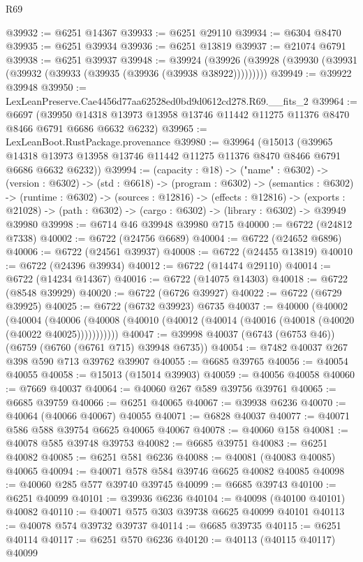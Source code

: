 \begin{lexlean}{R69}
\begin{coremodule}
{@39932 := @6251 @14367
@39933 := @6251 @29110
@39934 := @6304 @8470
@39935 := @6251 @39934
@39936 := @6251 @13819
@39937 := @21074 @6791
@39938 := @6251 @39937
@39948 := @39924
    (@39926 (@39928 (@39930 (@39931 (@39932 (@39933 (@39935 (@39936 (@39938 @38922)))))))))
@39949 := @39922 @39948
@39950 := LexLeanPreserve.Cae4456d77aa62528ed0bd9d0612cd278.R69.__fits_2
@39964 := @6697
    (@39950 @14318 @13973 @13958 @13746 @11442 @11275 @11376 @8470 @8466 @6791 @6686 @6632 @6232)
@39965 := LexLeanBoot.RustPackage.provenance
@39980 := @39964
    (@15013
      (@39965 @14318 @13973 @13958 @13746 @11442 @11275 @11376 @8470 @8466 @6791 @6686 @6632 @6232))
@39994 := (capacity : @18) ->
  ("name" : @6302) ->
  (version : @6302) ->
  (std : @6618) ->
  (program : @6302) ->
  (semantics : @6302) ->
  (runtime : @6302) ->
  (sources : @12816) ->
  (effects : @12816) ->
  (exports : @21028) -> (path : @6302) -> (cargo : @6302) -> (library : @6302) -> @39949 @39980
@39998 := @6714 @46 @39948 @39980 @715
@40000 := @6722 (@24812 @7338)
@40002 := @6722 (@24756 @6689)
@40004 := @6722 (@24652 @6896)
@40006 := @6722 (@24561 @39937)
@40008 := @6722 (@24455 @13819)
@40010 := @6722 (@24396 @39934)
@40012 := @6722 (@14474 @29110)
@40014 := @6722 (@14234 @14367)
@40016 := @6722 (@14075 @14303)
@40018 := @6722 (@8548 @39929)
@40020 := @6722 (@6726 @39927)
@40022 := @6722 (@6729 @39925)
@40025 := @6722 (@6732 @39923) @6735
@40037 := @40000
    (@40002
      (@40004
        (@40006 (@40008 (@40010 (@40012 (@40014 (@40016 (@40018 (@40020 (@40022 @40025)))))))))))
@40047 := @39998 @40037 (@6743 (@6753 @46)) (@6759 (@6760 (@6761 @715) @39948 @6735))
@40054 := @7482 @40037 @267 @398 @590 @713 @39762 @39907
@40055 := @6685 @39765
@40056 := @40054 @40055
@40058 := @15013 (@15014 @39903)
@40059 := @40056 @40058
@40060 := @7669 @40037
@40064 := @40060 @267 @589 @39756 @39761
@40065 := @6685 @39759
@40066 := @6251 @40065
@40067 := @39938 @6236
@40070 := @40064 (@40066 @40067) @40055
@40071 := @6828 @40037
@40077 := @40071 @586 @588 @39754 @6625 @40065 @40067
@40078 := @40060 @158
@40081 := @40078 @585 @39748 @39753
@40082 := @6685 @39751
@40083 := @6251 @40082
@40085 := @6251 @581 @6236
@40088 := @40081 (@40083 @40085) @40065
@40094 := @40071 @578 @584 @39746 @6625 @40082 @40085
@40098 := @40060 @285 @577 @39740 @39745
@40099 := @6685 @39743
@40100 := @6251 @40099
@40101 := @39936 @6236
@40104 := @40098 (@40100 @40101) @40082
@40110 := @40071 @575 @303 @39738 @6625 @40099 @40101
@40113 := @40078 @574 @39732 @39737
@40114 := @6685 @39735
@40115 := @6251 @40114
@40117 := @6251 @570 @6236
@40120 := @40113 (@40115 @40117) @40099
}
\end{coremodule}
\end{lexlean}
